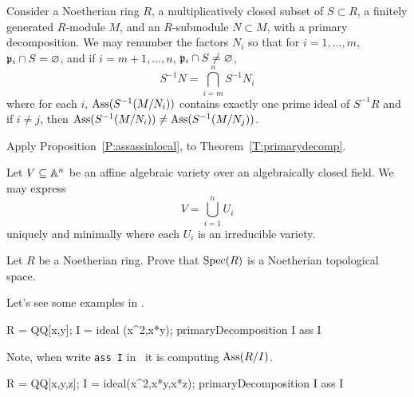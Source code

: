 \documentclass{ximera}
\begin{document}
\begin{theorem}
  Consider a Noetherian ring $R$, a multiplicatively closed subset of
  $S\subset R$, a finitely generated $R$-module $M$, and an
  $R$-submodule $N\subset M$, with a primary decomposition. We may
  renumber the factors $N_i$ so that for $i=1,\dots, m$, $\mathfrak{p}_i\cap S
  =\varnothing$, and if $i=m+1,\dots, n$, $\mathfrak{p}_i\cap S \ne\varnothing$,
  \[
  S^{-1}N = \bigcap_{i=m}^n S^{-1}N_i
  \]
  where for each $i$, $\operatorname{Ass}(S^{-1}(M/N_i))$ contains exactly one prime ideal
  of $S^{-1}R$ and if $i\ne j$, then $\operatorname{Ass}(S^{-1}(M/N_i)) \ne \operatorname{Ass}(S^{-1}(M/N_j))$.
  \begin{sketch}
    Apply Proposition~\ref{P:assassinlocal}, to Theorem~\ref{T:primarydecomp}.
  \end{sketch}
\end{theorem}




\begin{theorem}
  Let $V\subseteq\mathbb A^n$ be an affine algebraic variety over an
  algebraically closed field. We may express
  \[
  V = \bigcup_{i=1}^n U_i
  \]
  uniquely and minimally where each $U_i$ is an irreducible variety.
\end{theorem}


\begin{exercise}
  Let $R$ be a Noetherian ring. Prove that $\operatorname{Spec}(R)$ is a Noetherian topological space. 
\end{exercise}


Let's see some examples in \macaulay.

\begin{macaulay2}
R = QQ[x,y];
I = ideal (x^2,x*y);
primaryDecomposition I
ass I
\end{macaulay2}

Note, when write \texttt{ass I} in \macaulay\, it is computing
$\operatorname{Ass}(R/I)$.

\begin{macaulay2}
R = QQ[x,y,z];
I = ideal(x^2,x*y,x*z);
primaryDecomposition I
ass I
\end{macaulay2}







\end{document}
